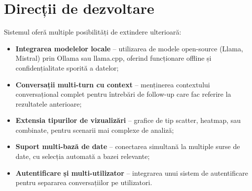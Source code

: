 \documentclass[12pt, a4paper]{report}
\begin{document}
\section{Direcții de dezvoltare}

Sistemul oferă multiple posibilități de extindere ulterioară:

\begin{itemize}[nosep]
  \item \textbf{Integrarea modelelor locale} -- utilizarea de modele open-source (Llama, Mistral) prin Ollama sau llama.cpp, oferind funcționare offline și confidențialitate sporită a datelor;
  \item \textbf{Conversații multi-turn cu context} -- menținerea contextului conversațional complet pentru întrebări de follow-up care fac referire la rezultatele anterioare;
  \item \textbf{Extensia tipurilor de vizualizări} -- grafice de tip scatter, heatmap, sau combinate, pentru scenarii mai complexe de analiză;
  \item \textbf{Suport multi-bază de date} -- conectarea simultană la multiple surse de date, cu selecția automată a bazei relevante;
  \item \textbf{Autentificare și multi-utilizator} -- integrarea unui sistem de autentificare pentru separarea conversațiilor pe utilizatori.
\end{itemize}
\end{document}
